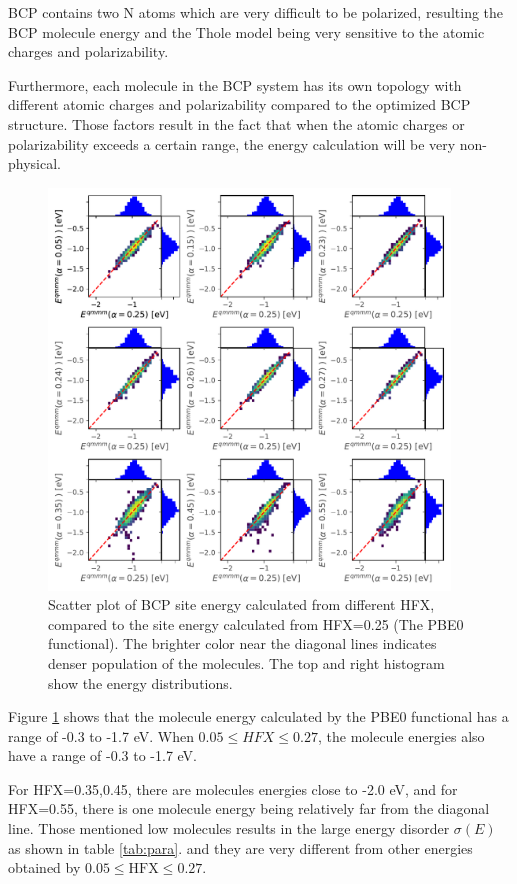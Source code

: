 \documentclass[letterpaper,12pt]{article}
\begin{document}
BCP contains two N atoms which are very difficult to be polarized, resulting the BCP molecule energy and the Thole model being very sensitive to the atomic charges and polarizability.

Furthermore, each molecule in the BCP system has its own topology with different atomic charges and polarizability compared to the optimized BCP structure.  
Those factors result in the fact that when the atomic charges or polarizability exceeds a certain range, the energy calculation will be very non-physical. 


\begin{figure}[H]
    \centering
    \includegraphics[width=0.95\textwidth]{figs/BCP_HFX/scatterE_qmmm.pdf}
    \caption{Scatter plot of BCP site energy calculated from different HFX, compared to the site energy calculated from HFX=0.25 (The PBE0 functional). The brighter color near the diagonal lines indicates denser population of the molecules.  The top and right histogram show the energy distributions.}
    \label{fig:E_qmmm_BCP}
\end{figure}

Figure \ref{fig:E_qmmm_BCP} shows that the molecule energy calculated by the PBE0 functional has a range of -0.3 to -1.7 eV. When $ 0.05 \leq HFX \leq 0.27 $, the molecule energies also have a range of -0.3 to -1.7 eV.

For HFX=0.35,0.45, there are molecules energies close to -2.0 eV, and for HFX=0.55, there is one molecule energy being relatively far from the diagonal line. 
Those mentioned low molecules results in the large energy disorder $\sigma(E)$ as shown in table \ref{tab:para}. 
and they are very different from other energies obtained by $ 0.05 \leq \text{HFX} \leq 0.27 $. 
\end{document}

